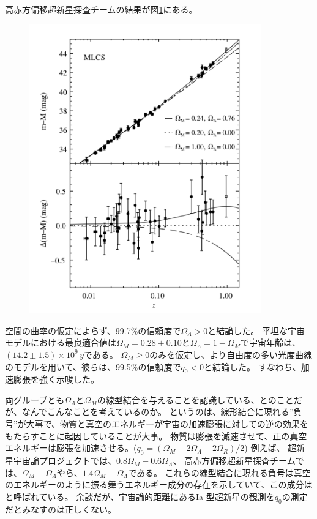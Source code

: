 \documentclass[11pt]{ltjsarticle}
\theoremstyle{plain}
\theoremstyle{break}
\begin{document}
高赤方偏移超新星探査チームの結果が図\ref{fig:1-2}にある。
\begin{figure}[h]
	\centering
	\includegraphics[width=10cm]{figure/fig1-2}
	\label{fig:1-2}
	\caption{}
\end{figure}%
空間の曲率の仮定によらず、99.7\%の信頼度で$\Omega_{\Lambda} > 0$と結論した。
平坦な宇宙モデルにおける最良適合値は$\Omega_{M}=0.28 \pm 0.10 $と$\Omega_{\Lambda}=1-\Omega_{M}$で宇宙年齢は、$(14.2\pm1.5)\times 10^ 9 \,y$である。
$\Omega_{M} \geq 0$のみを仮定し、より自由度の多い光度曲線のモデルを用いて、彼らは、99.5\%の信頼度で$q_0 < 0$と結論した。
すなわち、加速膨張を強く示唆した。

両グループとも$\Omega_{\Lambda}$と$\Omega_{M}$の線型結合を与えることを認識している、とのことだが、なんでこんなことを考えているのか。
というのは、線形結合に現れる”負号”が大事で、物質と真空のエネルギーが宇宙の加速膨張に対しての逆の効果をもたらすことに起因していることが大事。
物質は膨張を減速させて、正の真空エネルギーは膨張を加速させる。($q_0 = (\Omega_{M} - 2 \Omega_{\Lambda} + 2 \Omega_{R})/2$)
例えば、
超新星宇宙論プロジェクトでは、$0.8\Omega_{M} -  0.6  \Omega_{\Lambda}$、
高赤方偏移超新星探査チームでは、$\Omega_{M} -  \Omega_{\Lambda}$やら、$1.4 \Omega_{M} -   \Omega_{\Lambda}$である。
これらの線型結合に現れる負号は真空のエネルギーのように振る舞うエネルギー成分の存在を示していて、この成分はと呼ばれている。
余談だが、宇宙論的距離にあるIa 型超新星の観測を$q_0$の測定だとみなすのは正しくない。
\end{document}
